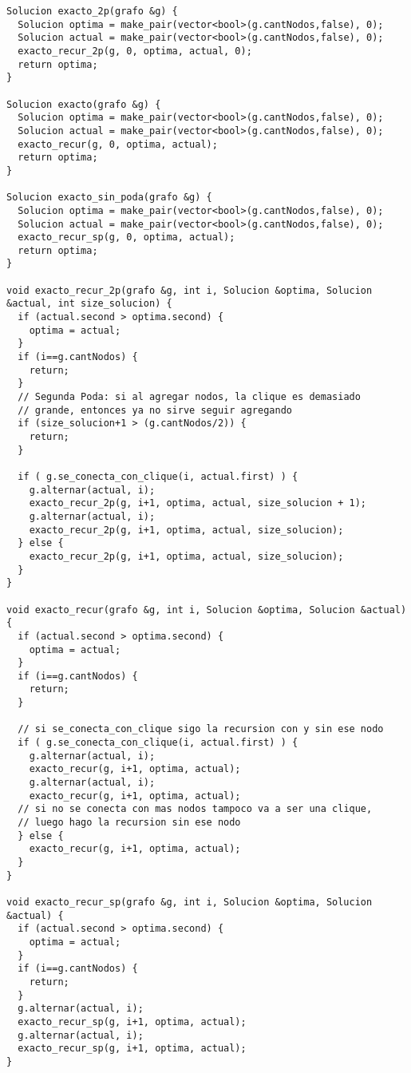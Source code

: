 \begin{lstlisting}
Solucion exacto_2p(grafo &g) {
  Solucion optima = make_pair(vector<bool>(g.cantNodos,false), 0);
  Solucion actual = make_pair(vector<bool>(g.cantNodos,false), 0);
  exacto_recur_2p(g, 0, optima, actual, 0);
  return optima;
}

Solucion exacto(grafo &g) {
  Solucion optima = make_pair(vector<bool>(g.cantNodos,false), 0);
  Solucion actual = make_pair(vector<bool>(g.cantNodos,false), 0);
  exacto_recur(g, 0, optima, actual);
  return optima;
}

Solucion exacto_sin_poda(grafo &g) {
  Solucion optima = make_pair(vector<bool>(g.cantNodos,false), 0);
  Solucion actual = make_pair(vector<bool>(g.cantNodos,false), 0);
  exacto_recur_sp(g, 0, optima, actual);
  return optima;
}

void exacto_recur_2p(grafo &g, int i, Solucion &optima, Solucion &actual, int size_solucion) {
  if (actual.second > optima.second) {
    optima = actual;
  }
  if (i==g.cantNodos) {
    return;
  }
  // Segunda Poda: si al agregar nodos, la clique es demasiado
  // grande, entonces ya no sirve seguir agregando
  if (size_solucion+1 > (g.cantNodos/2)) {
    return;
  }

  if ( g.se_conecta_con_clique(i, actual.first) ) {
    g.alternar(actual, i);
    exacto_recur_2p(g, i+1, optima, actual, size_solucion + 1);
    g.alternar(actual, i);
    exacto_recur_2p(g, i+1, optima, actual, size_solucion);
  } else {
    exacto_recur_2p(g, i+1, optima, actual, size_solucion);
  }
}

void exacto_recur(grafo &g, int i, Solucion &optima, Solucion &actual) {
  if (actual.second > optima.second) {
    optima = actual;
  }
  if (i==g.cantNodos) {
    return;
  }

  // si se_conecta_con_clique sigo la recursion con y sin ese nodo
  if ( g.se_conecta_con_clique(i, actual.first) ) {
    g.alternar(actual, i);
    exacto_recur(g, i+1, optima, actual);
    g.alternar(actual, i);
    exacto_recur(g, i+1, optima, actual);
  // si no se conecta con mas nodos tampoco va a ser una clique,
  // luego hago la recursion sin ese nodo
  } else {
    exacto_recur(g, i+1, optima, actual);
  }
}

void exacto_recur_sp(grafo &g, int i, Solucion &optima, Solucion &actual) {
  if (actual.second > optima.second) {
    optima = actual;
  }
  if (i==g.cantNodos) {
    return;
  }
  g.alternar(actual, i);
  exacto_recur_sp(g, i+1, optima, actual);
  g.alternar(actual, i);
  exacto_recur_sp(g, i+1, optima, actual);
}
\end{lstlisting}
